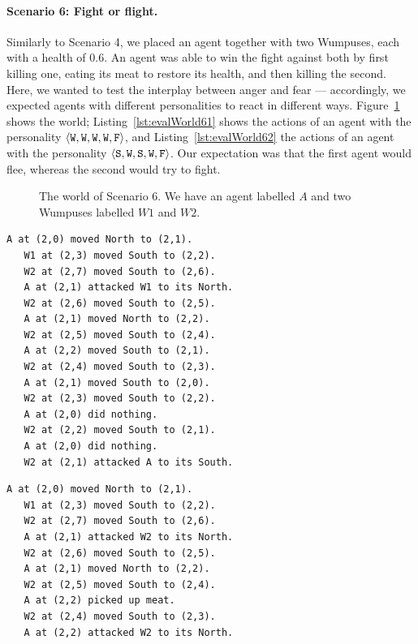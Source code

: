 \paragraph{Scenario 6: Fight or flight.} Similarly to Scenario 4, we placed an agent together with two Wumpuses, each with a health of 0.6. An agent was able to win the fight against both by first killing one, eating its meat to restore its health, and then killing the second. Here, we wanted to test the interplay between anger and fear --- accordingly, we expected agents with different personalities to react in different ways. Figure~\ref{fig:evalWorld6} shows the world; Listing~\ref{lst:evalWorld61} shows the actions of an agent with the personality $\langle \mathtt{W},\mathtt{W}, \mathtt{W}, \mathtt{W}, \mathtt{F} \rangle$, and Listing~\ref{lst:evalWorld62} the actions of an agent with the personality $\langle \mathtt{S},\mathtt{W}, \mathtt{S}, \mathtt{W}, \mathtt{F} \rangle$. Our expectation was that the first agent would flee, whereas the second would try to fight.

\begin{figure}[t]
    \centering
    
    \caption{The world of Scenario 6. We have an agent labelled $A$ and two Wumpuses labelled $W1$ and $W2$.}
    \label{fig:evalWorld6}
\end{figure}

\begin{lstlisting}[caption=Actions of an agent with the personality $\personality{W}{W}{W}{W}{F}$ in Scenario 6., label=lst:evalWorld61, float=t]
   A at (2,0) moved North to (2,1).
   W1 at (2,3) moved South to (2,2).
   W2 at (2,7) moved South to (2,6).
   A at (2,1) attacked W1 to its North.
   W2 at (2,6) moved South to (2,5).
   A at (2,1) moved North to (2,2).
   W2 at (2,5) moved South to (2,4).
   A at (2,2) moved South to (2,1).
   W2 at (2,4) moved South to (2,3).
   A at (2,1) moved South to (2,0).
   W2 at (2,3) moved South to (2,2).
   A at (2,0) did nothing.
   W2 at (2,2) moved South to (2,1).
   A at (2,0) did nothing.
   W2 at (2,1) attacked A to its South.
\end{lstlisting}

\begin{lstlisting}[caption=Actions of an agent with the personality $\personality{S}{W}{S}{W}{F}$ in Scenario 6., label=lst:evalWorld62, float=t]
   A at (2,0) moved North to (2,1).
   W1 at (2,3) moved South to (2,2).
   W2 at (2,7) moved South to (2,6).
   A at (2,1) attacked W2 to its North.
   W2 at (2,6) moved South to (2,5).
   A at (2,1) moved North to (2,2).
   W2 at (2,5) moved South to (2,4).
   A at (2,2) picked up meat.
   W2 at (2,4) moved South to (2,3).
   A at (2,2) attacked W2 to its North.
\end{lstlisting}

